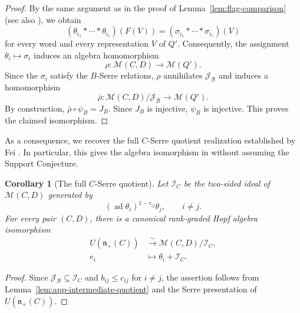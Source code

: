 \documentclass[12pt,reqno]{amsart}
\numberwithin{equation}{section}
\newtheorem{corollary}[theorem]{Corollary}
\theoremstyle{definition}
\theoremstyle{remark}
\newcommand{\nplus}{\mathfrak n_+}
\newcommand{\ad}{\operatorname{ad}}
\theoremstyle{plain}
\theoremstyle{plain}
\begin{document}
\begin{proof}
By the same argument as in the proof of Lemma~\ref{lem:flag-comparison}
(see also \cite[Appendix~A.2]{Fei26}), we obtain
\[
    (\theta_{i_1}*\cdots*\theta_{i_r})(F(V))
    =
    (\sigma_{i_1}*\cdots*\sigma_{i_r})(V)
\]
for every word and every representation $V$ of $Q'$. Consequently, the assignment $\theta_i\mapsto\sigma_i$ induces an algebra homomorphism
\[
    \rho:\mathcal M(C,D)\longrightarrow\mathcal M(Q').
\]
Since the $\sigma_i$ satisfy the $B$-Serre relations, $\rho$ annihilates $\mathcal J_{\mathscr B}$ and induces a homomorphism
\[
    \bar\rho:
    \mathcal M(C,D)/\mathcal J_{\mathscr B}
    \longrightarrow\mathcal M(Q').
\]
By construction, $\bar\rho\circ\psi_B=J_B$. Since $J_B$ is injective, $\psi_B$ is injective. This proves the claimed isomorphism.
\end{proof}

As a consequence, we recover the full $C$-Serre quotient realization established by Fei \cite[Theorem~10.1]{Fei26}. In particular, this gives the algebra isomorphism in \cite[Theorem~7.4(i)]{GLS18} without assuming the Support Conjecture.

\begin{corollary}[The full $C$-Serre quotient] \label{cor:app-full-Serre-quotient}
Let $\mathcal I_C$ be the two-sided ideal of $\mathcal M(C,D)$ generated by
\[
    (\ad\theta_i)^{1-c_{ij}}\theta_j,
    \qquad i\ne j.
\]
For every pair $(C,D)$, there is a canonical rank-graded Hopf algebra isomorphism
\[
\begin{aligned}
    U(\nplus(C))
    &\xrightarrow{\sim}
    \mathcal M(C,D)/\mathcal I_C,\\
    e_i&\longmapsto\theta_i+\mathcal I_C.
\end{aligned}
\]
\end{corollary}

\begin{proof}
Since $\mathcal J_{\mathscr B}\subseteq\mathcal I_C$ and $b_{ij}\le c_{ij}$ for $i\ne j$, the assertion follows from Lemma~\ref{lem:app-intermediate-quotient} and the Serre presentation of $U(\nplus(C))$.
\end{proof}




\end{document}
